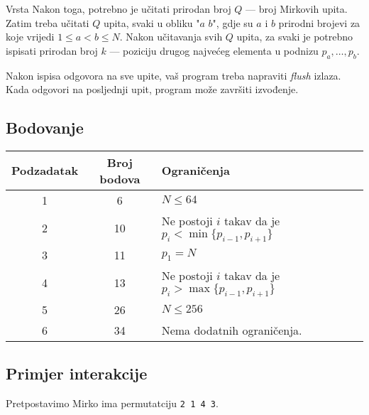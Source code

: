\begin{statement}[
  problempoints=100,
  timelimit=1 sekunda,
  memorylimit=512 MiB,
]{Vrsta}
Nakon toga, potrebno je učitati prirodan broj $Q$ — broj Mirkovih upita. Zatim treba učitati $Q$ upita, svaki u obliku "$a$ $b$", gdje su $a$ i $b$ prirodni brojevi za koje vrijedi $1 \le a < b \le N$. Nakon učitavanja svih $Q$ upita, za svaki je potrebno ispisati prirodan broj $k$ — poziciju drugog najvećeg elementa u podnizu $p_a, \ldots, p_b$.

Nakon ispisa odgovora na sve upite, vaš program treba napraviti \textit{flush} izlaza. Kada odgovori na posljednji upit, program može završiti izvođenje.

\subsection*{Bodovanje}


{\renewcommand{\arraystretch}{1.4}
  \setlength{\tabcolsep}{6pt}
  \begin{tabular}{ccl}
   Podzadatak & Broj bodova & Ograničenja \\ \midrule
   	1 & 6 & $N \leq 64$ \\
    2 & 10 & Ne postoji $i$ takav da je $p_i < \min\{p_{i - 1}, p_{i + 1}\}$ \\
    3 & 11 & $p_1 = N$ \\
    4 & 13 & Ne postoji $i$ takav da je $p_i > \max\{p_{i - 1}, p_{i + 1}\}$ \\
    5 & 26 & $N \leq 256$ \\
    6 & 34 & Nema dodatnih ograničenja. \\
\end{tabular}}

\subsection*{Primjer interakcije}

Pretpostavimo Mirko ima permutatciju \texttt{2 1 4 3}.


\end{statement}
